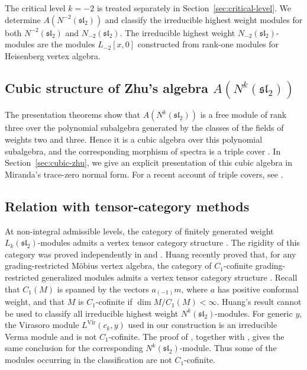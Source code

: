 \documentclass[11 pt]{amsart}
\theoremstyle{definition}
\theoremstyle{plain}
\newcommand{\Vir}{\mathrm{Vir}}
\begin{document}
The critical level $k=-2$ is treated separately in
Section~\ref{sec:critical-level}. We determine
$A(N^{-2}(\mathfrak{sl}_2))$ and classify the irreducible highest weight
modules for both $N^{-2}(\mathfrak{sl}_2)$ and
$N_{-2}(\mathfrak{sl}_2)$. The irreducible highest weight
$N_{-2}(\mathfrak{sl}_2)$-modules are the modules $L_{-2}[x,0]$
constructed from rank-one   modules for Heisenberg vertex algebra.

\subsection*{Cubic structure of Zhu's algebra
$A(N^k(\mathfrak{sl}_2))$}

The presentation theorems show that
$A(N^k(\mathfrak{sl}_2))$ is a free module of rank three over the
polynomial subalgebra generated by the classes of the fields of weights
two and three. Hence it is a cubic algebra over this polynomial
subalgebra, and the corresponding morphism of spectra is a triple cover
\cite{Miranda,Wood}. In Section~\ref{sec:cubic-zhu}, we give an explicit
presentation of this cubic algebra in Miranda's trace-zero normal form.
For a recent account of triple covers, see
\cite[Section~2]{GarbagnatiPenegini}.

\subsection*{Relation with tensor-category methods}
%
At non-integral admissible levels, the category of finitely generated
weight $L_k(\mathfrak{sl}_2)$-modules admits a vertex tensor category
structure \cite{CreutzigTensorSL2}. The rigidity of this category was
proved independently in \cite{CMYRibbonSL2} and \cite{NORW}.
Huang recently proved that, for any grading-restricted M\"obius vertex
algebra, the category of $C_1$-cofinite grading-restricted generalized
modules admits a vertex tensor category structure \cite{HuangC1}.
Recall that $C_1(M)$ is
spanned by the vectors $a_{(-1)}m$, where $a$ has positive conformal
weight, and that $M$ is $C_1$-cofinite if
$\dim M/C_1(M)<\infty$. Huang's result cannot be used to classify all
irreducible highest weight $N^k(\mathfrak{sl}_2)$-modules. For generic
$y$, the Virasoro module $L^{\Vir}(c_k,y)$ used in our construction is
an irreducible Verma module and is not $C_1$-cofinite. The proof of
\cite[Theorem~7.6]{CreutzigTensorSL2}, together with
\cite[Proposition~7.4]{CreutzigTensorSL2}, gives the same conclusion
for the corresponding $N^k(\mathfrak{sl}_2)$-module. Thus some of the
modules occurring in the classification are not $C_1$-cofinite.
\end{document}
